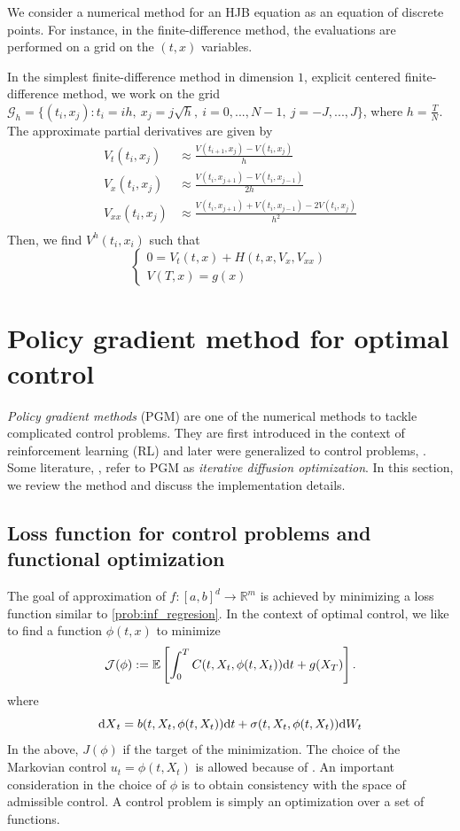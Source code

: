 \documentclass[11pt]{book}
\newcommand{\dt}{\text{\normalfont d}t}
\newcommand{\dX}{\text{\normalfont d}X}
\newcommand{\dW}{\text{\normalfont d}W}
\begin{document}
    We consider a numerical method for an HJB equation as an equation of discrete points. For instance, in the finite-difference method, the evaluations are performed on a grid on the $(t,x)$ variables. 
    \begin{eg}
        In the simplest finite-difference method in dimension $1$, explicit centered finite-difference method, we work on the grid $\mathcal{G}_h=\{(t_i,x_j):t_i=ih,~x_j=j\sqrt{h}, ~i=0,...,N-1,~j=-J,...,J\}$, where $h=\frac{T}{N}$. The approximate partial derivatives are given by
        \[
        \begin{split}
        V_t(t_i,x_j)&\approx\frac{V(t_{i+1},x_j)-V(t_{i},x_j)}{h}\\
        V_x(t_i,x_j)&\approx\frac{V(t_{i},x_{j+1})-V(t_{i},x_{j-1})}{2h}\\
        V_{xx}(t_i,x_j)&\approx\frac{V(t_{i},x_{j+1})+V(t_{i},x_{j-1})-2V(t_{i},x_{j})}{h^2}\\
        \end{split}
        \]
       Then, we find $V^h(t_i,x_i)$ such that
       \[
       \begin{cases}
    0= V_t(t,x) + H(t,x,V_x,V_{xx})\\
    V(T,x)=g(x)
\end{cases}
       \]
    \end{eg}
\section{Policy gradient method for optimal control}
\emph{Policy gradient methods} (PGM) are one of the numerical methods to tackle complicated control problems. They are first introduced in the context of reinforcement learning (RL) and later were generalized to control problems, \citet{Powell19}. Some literature, \citet{NR21}, refer to PGM as \emph{iterative diffusion optimization}. In this section, we review the method and discuss the implementation details. 
\subsection{Loss function for control problems and functional optimization}
The goal of  approximation of $f:[a,b]^d\to\mathbb{R}^m$ is achieved by minimizing a loss function similar to \eqref{prob:inf_regresion}. 
In the context of optimal control, we like to find a function $\phi(t,x)$ to minimize
\begin{equation}\label{func:loss_generic}
{\mathcal{J}}(\phi):=\mathbb{E}\left[\int_0^T C(t,X_t,\phi(t,X_t)){\dt}+g(X_T)\right].
\end{equation}
where 
\[
{\dX}_t =b(t,X_t,\phi(t,X_t)){\dt}+\sigma(t,X_t,\phi(t,X_t))\dW_t
\]
In the above, $J(\phi)$ if the target of the minimization. The choice of the Markovian control $u_t=\phi(t,X_t)$ is allowed because of \citet{el1987compactification,haussmann1986existence}. An important consideration in the choice of $\phi$ is to obtain consistency with the space of admissible control. 
A control problem is simply an optimization over a set of functions.
\end{document}
